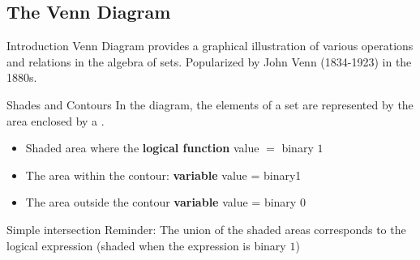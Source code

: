 \subsection{The Venn Diagram}
\begin{parag}{Introduction}
    Venn Diagram provides a graphical illustration of various operations and relations in the algebra of sets. Popularized by John Venn (1834-1923) in the 1880s.
\end{parag}
\begin{parag}{Shades and Contours}
    In the diagram, the elements of a set are represented by the area enclosed by a . \\
\begin{itemize}
    \item  Shaded area where the \textbf{logical function} value $=$ binary $1$
    \item The area within the contour: \textbf{variable} value = binary1 
    \item The area outside the contour \textbf{variable} value = binary $0$
\end{itemize}
\begin{subparag}{Simple intersection}
    Reminder: The union of the shaded areas corresponds to the logical expression (shaded when the expression is binary $1$)
\end{subparag}
\end{parag}


